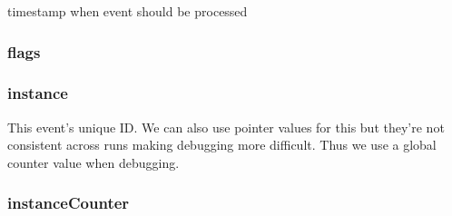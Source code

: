 timestamp when event should be processed \hypertarget{classEvent_aa991e2b209ef26272bf4fd920777bcda}{
\subsubsection[{flags}]{ {\bf flags}}}
\label{classEvent_aa991e2b209ef26272bf4fd920777bcda}
\hypertarget{classEvent_a4e89167460bd110a598d62294485718b}{
\subsubsection[{instance}]{ {\bf instance}}}
\label{classEvent_a4e89167460bd110a598d62294485718b}
This event's unique ID. We can also use pointer values for this but they're not consistent across runs making debugging more difficult. Thus we use a global counter value when debugging. \hypertarget{classEvent_adffdf007f19587d7dd80ff0a81bef600}{
\subsubsection[{instanceCounter}]{ {\bf instanceCounter}}}
\label{classEvent_adffdf007f19587d7dd80ff0a81bef600}


